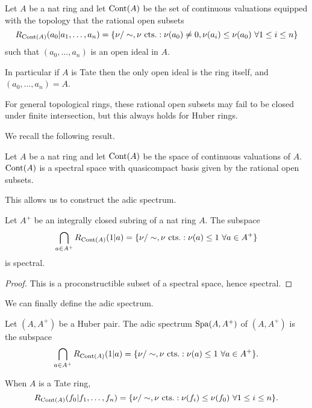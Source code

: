 \begin{definition}\label{def: space of continuous valuations}
    Let $A$ be a nat ring and let $\mathrm{Cont}(A)$ be the set of continuous valuations equipped with the topology that the rational open subsets 
    $$R_{\mathrm{Cont}(A)}(a_{0}|a_{1},\dots,a_{n})=\left\{\nu/\sim,\nu\text{ cts.}:\nu(a_{0})\neq0,\nu(a_{i})\leq\nu(a_{0})\text{ }\forall 1\leq i\leq n\right\}$$
    such that $(a_{0},\dots,a_{n})$ is an open ideal in $A$. 
\end{definition}
\begin{remark}
    In particular if $A$ is Tate then the only open ideal is the ring itself, and $(a_{0},\dots,a_{n})=A$. 
\end{remark}
\begin{remark}
    For general topological rings, these rational open subsets may fail to be closed under finite intersection, but this always holds for Huber rings. 
\end{remark}
We recall the following result. 
\begin{proposition}\label{prop: cont is spectral}
    Let $A$ be a nat ring and let $\mathrm{Cont}(A)$ be the space of continuous valuations of $A$. $\mathrm{Cont}(A)$ is a spectral space with quasicompact basis given by the rational open subsets. 
\end{proposition}
This allows us to construct the adic spectrum. 
\begin{corollary}\label{corr: adic spectrum is spectral}
    Let $A^{+}$ be an integrally closed subring of a nat ring $A$. The subspace
    $$\bigcap_{a\in A^{+}}R_{\mathrm{Cont}(A)}(1|a)=\{\nu/\sim,\nu\text{ cts.}:\nu(a)\leq 1\text{ }\forall a\in A^{+}\}$$
    is spectral.
\end{corollary}
\begin{proof}
    This is a proconstructible subset of a spectral space, hence spectral. 
\end{proof}
We can finally define the adic spectrum. 
\begin{definition}\label{def: affinoid adic space}
    Let $(A,A^{+})$ be a Huber pair. The adic spectrum $\mathrm{Spa}(A,A^{+})$ of $(A,A^{+})$ is the subspace 
    $$\bigcap_{a\in A^{+}}R_{\mathrm{Cont}(A)}(1|a)=\{\nu/\sim,\nu\text{ cts.}:\nu(a)\leq 1\text{ }\forall a\in A^{+}\}.$$
\end{definition}
\begin{remark}
    When $A$ is a Tate ring, 
    $$R_{\mathrm{Cont}(A)}(f_{0}|f_{1},\dots,f_{n})=\{\nu/\sim,\nu\text{ cts.}:\nu(f_{i})\leq\nu(f_{0})\text{ }\forall 1\leq i\leq n\}.$$
\end{remark}
